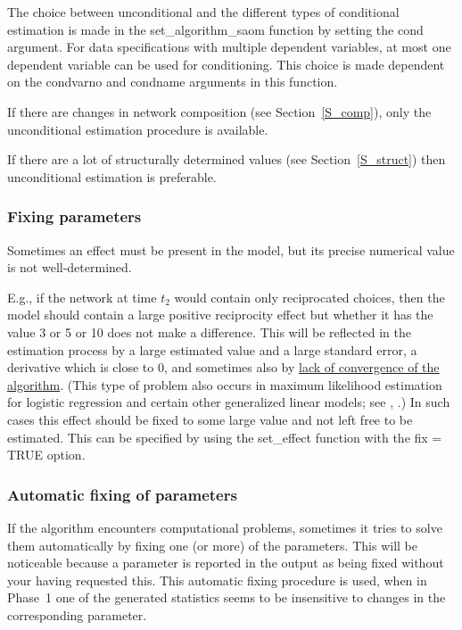 \documentclass[a4paper,fleqn,11pt]{article}
\newcommand{\+}{\, + \,}
\begin{document}
The choice between
unconditional and the different types of conditional estimation is
made in the \textsf{set\_algorithm\_saom} function by setting the
\textsf{cond} argument.
For data specifications with multiple dependent variables,
at most one dependent variable can be used for conditioning.
This choice is made dependent on the
\textsf{condvarno} and \textsf{condname} arguments in this function.

If there are changes in network composition (see
Section~\ref{S_comp}), only the unconditional estimation procedure
is available.

If there are a lot of structurally determined values (see Section~\ref{S_struct})
then unconditional estimation is preferable.


\subsubsection{Fixing parameters}
\label{S_fixingparameters}

\hypertarget{T_fix}{Sometimes an effect must be present in the
model, but its precise numerical value is not well-determined.}
E.g., if the network at time $t_2$ would contain only reciprocated
choices, then the model should contain a large positive
reciprocity effect but whether it has the value 3 or 5 or 10 does
not make a difference. This will be reflected in the estimation
process by a large estimated value and a large standard error, a
derivative which is close to 0, and sometimes also by
\hyperlink{T_convergence}{lack of convergence of the algorithm}.
(This type of problem also occurs in maximum likelihood estimation
for logistic regression and certain other generalized linear
models; \label{LargeFix} see \citet[section 1.6]{GeyerThompson92},
\citet{AlbertAnderson84, HauckDonner77}.)
In such cases this effect
should be fixed to some large value and not left free to be
estimated. This can be specified
by using the \textsf{set\_effect} function with the
\textsf{fix = TRUE} option.



\subsubsection{Automatic fixing of parameters}
\label{S_fixing}

If the algorithm encounters computational
problems, sometimes it tries to solve them automatically by fixing
one (or more) of the parameters. This will be noticeable because a
parameter is reported in the output as being fixed without your
having requested this. This automatic fixing procedure is used,
when in Phase~1 one of the generated statistics seems to be
insensitive to changes in the corresponding parameter.
\end{document}
